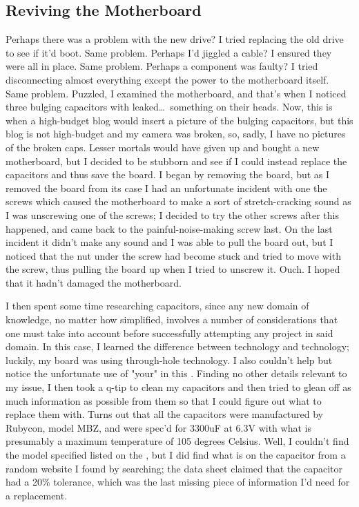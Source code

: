 \documentclass{article}
\begin{document}
\subsection{Reviving the Motherboard}
Perhaps there was a problem with the new drive?  I tried replacing the old drive to see if it'd boot.  Same problem.  Perhaps I'd jiggled a cable?  I ensured they were all in place.  Same problem.  Perhaps a component was faulty?  I tried disconnecting almost everything except the power to the motherboard itself.  Same problem.  Puzzled, I examined the motherboard, and that's when I noticed three bulging capacitors with leaked\ldots~something on their heads.  Now, this is when a high-budget blog would insert a picture of the bulging capacitors, but this blog is not high-budget and my camera was broken, so, sadly, I have no pictures of the broken caps.  Lesser mortals would have given up and bought a new motherboard, but I decided to be stubborn and see if I could instead replace the capacitors and thus save the board.  I began by removing the board, but as I removed the board from its case I had an unfortunate incident with one the screws which caused the motherboard to make a sort of stretch-cracking sound as I was unscrewing one of the screws;  I decided to try the other screws after this happened, and came back to the painful-noise-making screw last.  On the last incident it didn't make any sound and I was able to pull the board out, but I noticed that the nut under the screw had become stuck and tried to move with the screw, thus pulling the board up when I tried to unscrew it.  Ouch.  I hoped that it hadn't damaged the motherboard.

I then spent some time researching capacitors, since any new domain of knowledge, no matter how simplified, involves a number of considerations that one must take into account before successfully attempting any project in said domain.  In this case, I learned the difference between  technology and  technology; luckily, my board was using through-hole technology.  I also couldn't help but notice the unfortunate use of "your" in this .  Finding no other details relevant to my issue, I then took a q-tip to clean my capacitors and then tried to glean off as much information as possible from them so that I could figure out what to replace them with.  Turns out that all the capacitors were manufactured by Rubycon, model MBZ, and were spec'd for 3300uF at 6.3V with what is presumably a maximum temperature of 105 degrees Celsius.  Well, I couldn't find the model specified listed on the , but I did find what is  on the capacitor from a random website I found by searching; the data sheet claimed that the capacitor had a 20\% tolerance, which was the last missing piece of information I'd need for a replacement.
\end{document}
